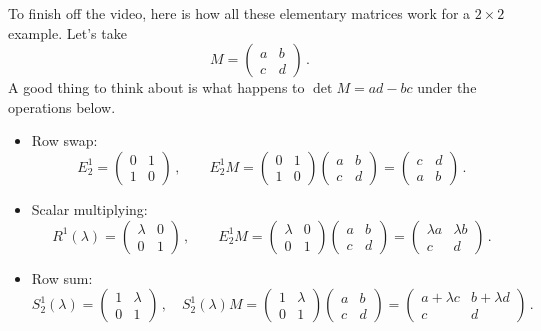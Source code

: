 {To finish off the video, here is how all these elementary matrices work for a $2\times 2$ example. Let's take 
\[
M=\begin{pmatrix}a&b\\c&d\end{pmatrix}\, .
\]
A good thing to think about is what happens to $\det M = ad-bc$ under the operations below.
\begin{itemize}
\item Row swap:
\[
E^1_2=\begin{pmatrix}0&1\\1&0\end{pmatrix}\, ,\qquad
E^1_2 M = \begin{pmatrix}0&1\\1&0\end{pmatrix}\begin{pmatrix}a&b\\c&d\end{pmatrix}
=\begin{pmatrix}c&d\\a&b\end{pmatrix}\, .
\]
\item Scalar multiplying:
\[
R^1(\lambda)=\begin{pmatrix}\lambda&0\\0&1\end{pmatrix}\, ,\qquad
E^1_2 M = \begin{pmatrix}\lambda&0\\0&1\end{pmatrix}\begin{pmatrix}a&b\\c&d\end{pmatrix}
=\begin{pmatrix}\lambda a&\lambda b\\c&d\end{pmatrix}\, .
\]
\item Row sum:
\[
S^1_2(\lambda)=\begin{pmatrix}1&\lambda\\0&1\end{pmatrix}\, ,\quad
S^1_2(\lambda) M = \begin{pmatrix}1&\lambda\\0&1\end{pmatrix}\begin{pmatrix}a&b\\c&d\end{pmatrix}
=\begin{pmatrix}a+\lambda c&b+\lambda d\\c&d\end{pmatrix}\, .
\]
\end{itemize}


} %

